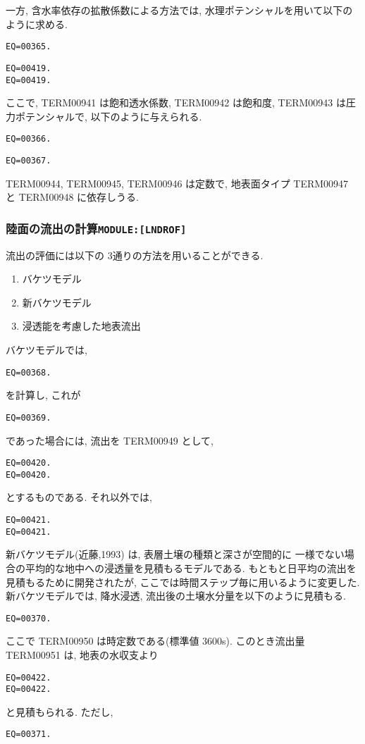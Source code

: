 一方, 含水率依存の拡散係数による方法では, 
水理ポテンシャルを用いて以下のように求める.
\begin{verbatim}
EQ=00365.
\end{verbatim}
\begin{verbatim}
EQ=00419.
EQ=00419.
\end{verbatim}
ここで, TERM00941 は飽和透水係数, TERM00942 は飽和度, TERM00943 は圧力ポテンシャルで, 
以下のように与えられる. 
\begin{verbatim}
EQ=00366.
\end{verbatim}
\begin{verbatim}
EQ=00367.
\end{verbatim}
TERM00944, TERM00945, TERM00946 は定数で, 地表面タイプ TERM00947 と TERM00948 に依存しうる. 

\subsubsection{陸面の流出の計算\texttt{MODULE:[LNDROF]}}

流出の評価には以下の 3通りの方法を用いることができる. 
\begin{enumerate}
\item バケツモデル
\item 新バケツモデル
\item 浸透能を考慮した地表流出
\end{enumerate}

バケツモデルでは,
\begin{verbatim}
EQ=00368.
\end{verbatim}
を計算し, これが
\begin{verbatim}
EQ=00369.
\end{verbatim}
であった場合には, 流出を TERM00949 として,
\begin{verbatim}
EQ=00420.
EQ=00420.
\end{verbatim}
とするものである.
それ以外では, 
\begin{verbatim}
EQ=00421.
EQ=00421.
\end{verbatim}

新バケツモデル(近藤,1993) は, 表層土壌の種類と深さが空間的に
一様でない場合の平均的な地中への浸透量を見積もるモデルである. 
もともと日平均の流出を見積もるために開発されたが, 
ここでは時間ステップ毎に用いるように変更した. 
%
新バケツモデルでは, 降水浸透, 流出後の土壌水分量を以下のように見積もる. 
\begin{verbatim}
EQ=00370.
\end{verbatim}
ここで TERM00950 は時定数である(標準値 3600s). 
%
このとき流出量 TERM00951 は, 地表の水収支より
\begin{verbatim}
EQ=00422.
EQ=00422.
\end{verbatim}
と見積もられる. 
ただし,
\begin{verbatim}
EQ=00371.
\end{verbatim}


